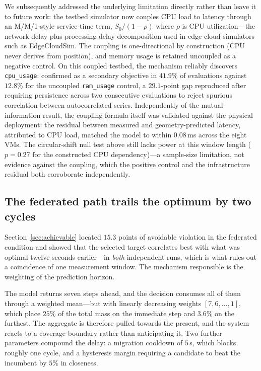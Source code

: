 \documentclass[conference]{IEEEtran}
\begin{document}
We subsequently addressed the underlying limitation directly rather than
leave it to future work: the testbed simulator now couples CPU load to
latency through an M/M/1-style service-time term, $S_0/(1-\rho)$ where
$\rho$ is CPU utilization---the network-delay-plus-processing-delay
decomposition used in edge-cloud simulators such as EdgeCloudSim. The
coupling is one-directional by construction (CPU never derives from
position), and memory usage is retained uncoupled as a negative control. On
this coupled testbed, the mechanism reliably discovers \texttt{cpu\_usage}:
confirmed as a secondary objective in $41.9\%$ of evaluations against
$12.8\%$ for the uncoupled \texttt{ram\_usage} control, a $29.1$-point gap
reproduced after requiring persistence across two consecutive evaluations to
reject spurious correlation between autocorrelated series. Independently of
the mutual-information result, the coupling formula itself was validated
against the physical deployment: the residual between measured and
geometry-predicted latency, attributed to CPU load, matched the model to
within $0.08$\,ms across the eight VMs. The circular-shift null test above
still lacks power at this window length ($p=0.27$ for the constructed CPU
dependency)---a sample-size limitation, not evidence against the coupling,
which the positive control and the infrastructure residual both corroborate
independently.

\subsection{The federated path trails the optimum by two cycles}
\label{sec:limit-lag}

Section~\ref{sec:achievable} located $15.3$ points of avoidable violation in
the federated condition and showed that the selected target correlates best
with what was optimal twelve seconds earlier---in \emph{both} independent
runs, which is what rules out a coincidence of one measurement window. The
mechanism responsible is the weighting of the prediction horizon.

The model returns seven steps ahead, and the decision consumes all of them
through a weighted mean---but with linearly decreasing weights
$[7,6,\ldots,1]$, which place $25\%$ of the total mass on the immediate step
and $3.6\%$ on the furthest. The aggregate is therefore pulled towards the
present, and the system reacts to a coverage boundary rather than
anticipating it. Two further parameters compound the delay: a migration
cooldown of $5$\,s, which blocks roughly one cycle, and a hysteresis margin
requiring a candidate to beat the incumbent by $5\%$ in closeness.
\end{document}
